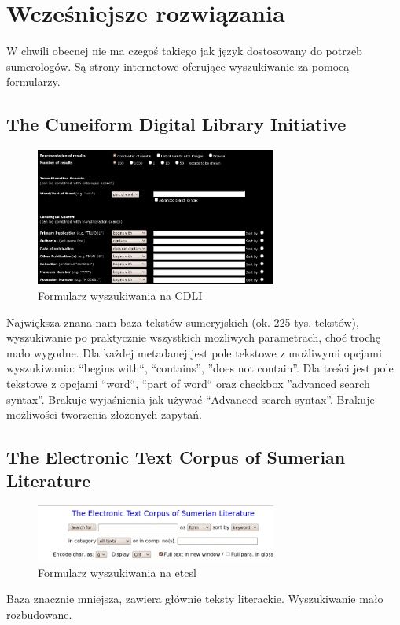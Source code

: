 \chapter{Wcześniejsze rozwiązania}\label{r:losers}
W chwili obecnej nie ma czegoś takiego jak język dostosowany do potrzeb sumerologów. 
Są strony internetowe oferujące wyszukiwanie za pomocą formularzy.
\section{The Cuneiform Digital Library Initiative \cite{cdli}}
\begin{figure}[h]
 \centering
 \includegraphics[width=300px]{../diagramy/cdli-search.png}
 \caption{Formularz wyszukiwania na CDLI}
 \label{fig:cdli-search}
\end{figure}

Największa znana nam baza tekstów sumeryjskich (ok. 225 tys. tekstów), 
wyszukiwanie po praktycznie wszystkich możliwych parametrach, choć trochę mało wygodne. 
Dla każdej metadanej jest pole tekstowe z możliwymi opcjami wyszukiwania: ``begins with``, ``contains'', ''does not contain''. 
Dla treści jest pole tekstowe z opcjami ``word``, ``part of word`` oraz checkbox ''advanced search syntax''. 
Brakuje wyjaśnienia jak 
używać ``Advanced search syntax''. Brakuje możliwości tworzenia złożonych zapytań.

\section{The Electronic Text Corpus of Sumerian Literature \cite{etcsl}} 
\begin{figure}[h]
 \centering
 \includegraphics[width=300px]{../diagramy/etcsl-search.png}
 \caption{Formularz wyszukiwania na etcsl}
 \label{fig:etcsl-search}
\end{figure}

Baza znacznie mniejsza, zawiera 
głównie teksty literackie. Wyszukiwanie mało rozbudowane.

